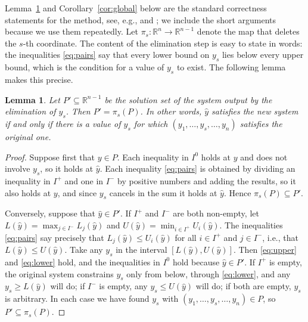 \documentclass[11pt]{article}
\newtheorem{lemma}{Lemma}
\theoremstyle{definition}
\newcommand{\Ipos}{I^{+}}
\newcommand{\Ineg}{I^{-}}
\newcommand{\Izero}{I^{0}}
\begin{document}
Lemma~\ref{lem:step} and Corollary~\ref{cor:global} below are the standard correctness statements for the method, see, e.g., \cite[Chapter~12]{schrijver1986} and \cite[Lecture~1]{ziegler1995}; we include the short arguments because we use them repeatedly. Let $\pi_s:\mathbb{R}^{n}\to\mathbb{R}^{n-1}$ denote the map that deletes the $s$-th coordinate. The content of the elimination step is easy to state in words: the inequalities \eqref{eq:pairs} say that every lower bound on $y_s$ lies below every upper bound, which is the condition for a value of $y_s$ to exist. The following lemma makes this precise.

\begin{lemma}
\label{lem:step}
Let $P'\subseteq\mathbb{R}^{n-1}$ be the solution set of the system output by the elimination of $y_s$. Then $P'=\pi_s(P)$. In other words, $\hat y$ satisfies the new system if and only if there is a value of $y_s$ for which $(y_1,\dots,y_s, \dots,y_n)$ satisfies the original one.
\end{lemma}

\begin{proof}
Suppose first that $y\in P$. Each inequality in $\Izero$ holds at $y$ and does not involve $y_s$, so it holds at $\hat y$. Each inequality \eqref{eq:pairs} is obtained by dividing an inequality in $\Ipos$ and one in $\Ineg$ by positive numbers and adding the results, so it also holds at $y$, and since $y_s$ cancels in the sum it holds at $\hat y$. Hence $\pi_s(P)\subseteq P'$.

Conversely, suppose that $\hat y\in P'$. If $\Ipos$ and $\Ineg$ are both non-empty, let $L(\hat y)=\max_{j\in\Ineg}L_j(\hat y)$ and $U(\hat y)=\min_{i\in\Ipos}U_i(\hat y)$. The inequalities \eqref{eq:pairs} say precisely that $L_j(\hat y)\le U_i(\hat y)$ for all $i\in\Ipos$ and $j\in\Ineg$, i.e., that $L(\hat y)\le U(\hat y)$. Take any $y_s$ in the interval $[L(\hat y),U(\hat y)]$. Then \eqref{eq:upper} and \eqref{eq:lower} hold, and the inequalities in $\Izero$ hold because $\hat y\in P'$. If $\Ipos$ is empty, the original system constrains $y_s$ only from below, through \eqref{eq:lower}, and any $y_s\ge L(\hat y)$ will do; if $\Ineg$ is empty, any $y_s\le U(\hat y)$ will do; if both are empty, $y_s$ is arbitrary. In each case we have found $y_s$ with $(y_1,\dots,y_s, \dots,y_n)\in P$, so $P'\subseteq\pi_s(P)$.
\end{proof}
\end{document}
